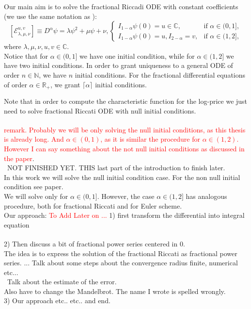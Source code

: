 \documentclass[a4paper,italian,11pt]{book}
\theoremstyle{plain}
\theoremstyle{remark}
\theoremstyle{plain}
\begin{document}
Our main aim is to solve the fractional Riccadi ODE with constant coefficients (we use the same notation as \cite{Main}):
\begin{equation}
    \label{eq: fractionalRiccati}
    [\mathcal{E}_{\lambda, \mu, \nu}^{u,v}] \equiv D^\alpha \psi = \lambda \psi^2 + \mu \psi  +\nu, 
    \begin{cases}
    I_{1-\alpha}\psi(0) = u \in \mathbb{C}, & \mbox{if } \alpha \in (0,1],\\
    I_{1-\alpha} \psi(0)=u, I_{2-\alpha} = v, & \mbox{if } \alpha \in (1,2],
    \end{cases}
\end{equation}
where $\lambda, \mu, \nu , u , v  \in \mathbb{C}$.
\\

Notice that for $\alpha \in (0,1]$ we have one initial condition, while for $\alpha \in (1,2]$ we have two initial conditions. In order to grant uniqueness to a general ODE of order $n\in \mathbb{N}$, we have $n$ initial conditions. For the fractional differential equations of order $\alpha \in \mathbb{R}_+$, we grant $\lceil \alpha \rceil$ initial conditions. 

Note that in order to compute the characteristic function for the log-price we just need to solve fractional Riccati ODE with null initial conditions. 
\\
\\
\textcolor{red}{remark. Probably we will be only solving the null initial conditions, as this thesis is already long. And $\alpha \in (0,1)$, as it is similar the procedure for $\alpha\in(1,2)$. However I can say something about the not null initial conditions as discussed in the paper}.
\\\
NOT FINISHED YET. THIS last part of the introduction to finish later.
\\
In this work we will solve the null initial condition case. For the non null initial condition see paper. \\
We will solve only for $\alpha \in (0,1]$. However, the case $\alpha\in (1,2]$ has analogous procedure, both for fractional Riccati and for Euler scheme.
\\
Our approach: 
\textcolor{red}{ To Add Later on ...}
1) first transform the differential into integral equation
\\
\\
2) Then discuss a bit of fractional power series centered in 0.
\\
The idea is to express the solution of the fractional Riccati as fractional power series. ... Talk about some steps about the convergence radius finite, numerical etc...
\\\
Talk about the estimate of the error.
\\
Also have to change the Mandelbrot. The name I wrote is spelled wrongly.
\\
3) Our approach etc.. etc.. and end.
\end{document}
